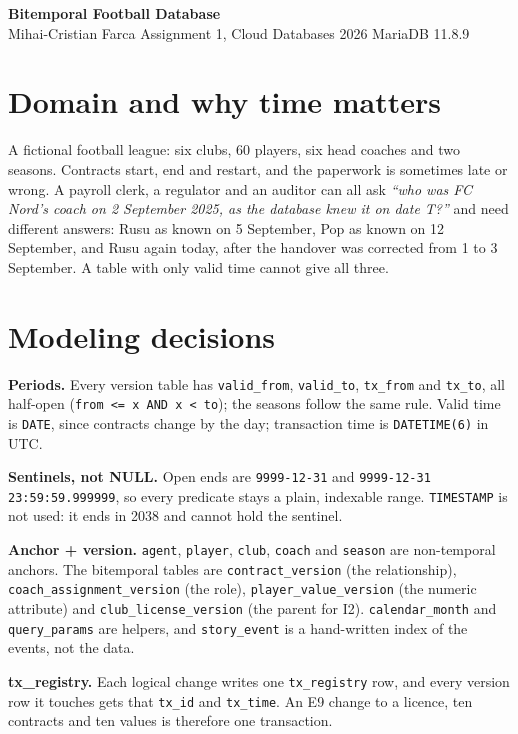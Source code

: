 \documentclass[10pt,a4paper]{article}
\newcommand{\code}[1]{\texttt{\small #1}}
\begin{document}
\begin{center}
{\Large\bfseries Bitemporal Football Database}\\[2pt]
{\small Mihai-Cristian Farca \quad Assignment 1, Cloud Databases 2026 \quad MariaDB 11.8.9}
\end{center}

\section{Domain and why time matters}
A fictional football league: six clubs, 60 players, six head coaches and two
seasons.  Contracts start, end and restart, and the paperwork is sometimes late or
wrong.  A payroll clerk, a regulator and an auditor can all ask \emph{``who was FC
Nord's coach on 2 September 2025, as the database knew it on date T?''} and need
different answers: Rusu as known on 5 September, Pop as known on 12 September, and
Rusu again today, after the handover was corrected from 1 to 3 September.  A table
with only valid time cannot give all three.

\section{Modeling decisions}
\textbf{Periods.}  Every version table has \code{valid\_from}, \code{valid\_to},
\code{tx\_from} and \code{tx\_to}, all half-open (\code{from <= x AND x < to});
the seasons follow the same rule.  Valid time is \code{DATE}, since contracts change
by the day; transaction time is \code{DATETIME(6)} in UTC.

\textbf{Sentinels, not NULL.}  Open ends are \code{9999-12-31} and
\code{9999-12-31 23:59:59.999999}, so every predicate stays a plain, indexable range.
\code{TIMESTAMP} is not used: it ends in 2038 and cannot hold the sentinel.

\textbf{Anchor + version.}  \code{agent}, \code{player}, \code{club}, \code{coach}
and \code{season} are non-temporal anchors.  The bitemporal tables are
\code{contract\_version} (the relationship), \code{coach\_assignment\_version} (the
role), \code{player\_value\_version} (the numeric attribute) and
\code{club\_license\_version} (the parent for I2).  \code{calendar\_month} and
\code{query\_params} are helpers, and \code{story\_event} is a hand-written index of
the events, not the data.

\textbf{tx\_registry.}  Each logical change writes one \code{tx\_registry} row, and
every version row it touches gets that \code{tx\_id} and \code{tx\_time}.  An E9
change to a licence, ten contracts and ten values is therefore one transaction.
\end{document}

